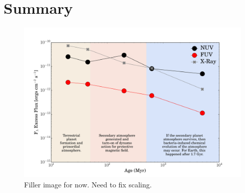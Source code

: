 \documentclass[twocolumn]{aastex62}
\begin{document}
\section{Summary}

\begin{figure}[h]
\includegraphics[width=\linewidth]{planet_timeline_xray.pdf}
\caption{Filler image for now. Need to fix scaling. \label{fig:planet_timeline}}
\end{figure}


\end{document}
